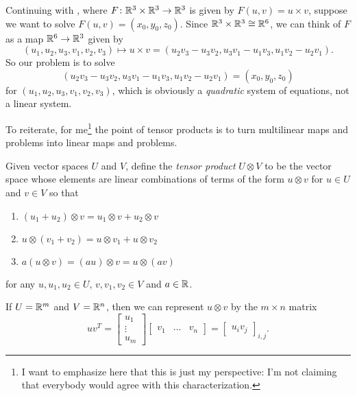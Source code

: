 \begin{example}\label{ex:cross product as bilinear map 2}
	Continuing with , where $F \colon\thinspace\! \mathbb{R}^3 \times \mathbb{R}^3 \to \mathbb{R}^3$ is given by $F(u,v) = u \times v$, suppose we want to solve $F(u,v) = (x_0,y_0,z_0)$. Since $\mathbb{R}^3 \times \mathbb{R}^3 \cong \mathbb{R}^6$, we can think of $F$ as a map $\mathbb{R}^6 \to \mathbb{R}^3$ given by
	\[
		(u_1,u_2,u_3,v_1,v_2,v_3) \mapsto u \times v = (u_2 v_3 - u_3 v_2, u_3 v_1 - u_1 v_3, u_1 v_2 - u_2 v_1).
	\]
	So our problem is to solve
	\[
		(u_2 v_3 - u_3 v_2, u_3 v_1 - u_1 v_3, u_1 v_2 - u_2 v_1) = (x_0,y_0,z_0)
	\]
	for $(u_1,u_2,u_3,v_1,v_2,v_3)$, which is obviously a \emph{quadratic} system of equations, not a linear system.
\end{example}

To reiterate, for me\footnote{I want to emphasize here that this is just my perspective: I'm not claiming that everybody would agree with this characterization.} the point of tensor products is to turn multilinear maps and problems into linear maps and problems.

\begin{definition}\label{def:tensor product}
	Given vector spaces $U$ and $V$, define the \emph{tensor product} $U \otimes V$ to be the vector space whose elements are linear combinations of terms of the form $u \otimes v$ for $u \in U$ and $v \in V$ so that 
	\begin{enumerate}
		\item $(u_1 + u_2) \otimes v = u_1 \otimes v + u_2 \otimes v$
		\item $u \otimes (v_1 + v_2) = u \otimes v_1 + u \otimes v_2$
		\item $a(u \otimes v) = (au) \otimes v = u \otimes (av)$
	\end{enumerate}
	for any $u,u_1,u_2 \in U$, $v,v_1,v_2 \in V$ and $a \in \mathbb{R}$.
\end{definition}

\begin{example}\label{ex:tensor product and outer product}
	If $U = \mathbb{R}^m$ and $V = \mathbb{R}^n$, then we can represent $u \otimes v$ by the $m \times n$ matrix 
	\[
		uv^T = \begin{bmatrix} u_1 \\ \vdots \\ u_m \end{bmatrix} \begin{bmatrix} v_1 & \dots & v_n \end{bmatrix} = \begin{bmatrix} u_i v_j \end{bmatrix}_{i,j}.
	\]
\end{example}

